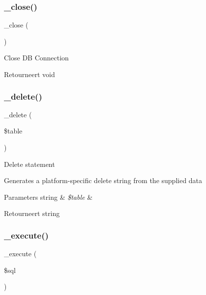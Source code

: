 \subsubsection{\texorpdfstring{\_close()}{\_close()}}
{\footnotesize\ttfamily \+\_\+close (\begin{DoxyParamCaption}{ }\end{DoxyParamCaption})\hspace{0.3cm}{\ttfamily [protected]}}

Close DB Connection

\begin{DoxyReturn}{Retourneert}
void 
\end{DoxyReturn}
\mbox{\label{class_c_i___d_b__sqlsrv__driver_a133ea8446ded52589bd22cc9163d0896}} 
\subsubsection{\texorpdfstring{\_delete()}{\_delete()}}
{\footnotesize\ttfamily \+\_\+delete (\begin{DoxyParamCaption}\item[{}]{\$table }\end{DoxyParamCaption})\hspace{0.3cm}{\ttfamily [protected]}}

Delete statement

Generates a platform-\/specific delete string from the supplied data


\begin{DoxyParams}[1]{Parameters}
string & {\em \$table} & \\
\hline
\end{DoxyParams}
\begin{DoxyReturn}{Retourneert}
string 
\end{DoxyReturn}
\mbox{\label{class_c_i___d_b__sqlsrv__driver_a114ab675d89bf8324a41785fb475e86d}} 
\subsubsection{\texorpdfstring{\_execute()}{\_execute()}}
{\footnotesize\ttfamily \+\_\+execute (\begin{DoxyParamCaption}\item[{}]{\$sql }\end{DoxyParamCaption})\hspace{0.3cm}{\ttfamily [protected]}}


